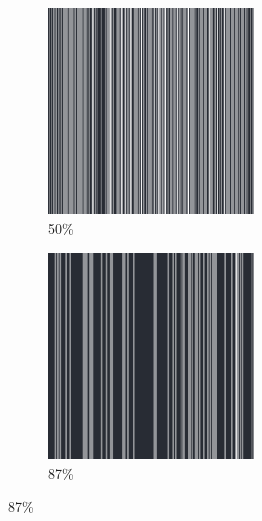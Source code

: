 \documentclass[12pt, fleqn]{report}                             %
\theoremstyle{break}                                            %
\begin{document}
\begin{figure}[ht!]
\begin{subfigure}[b]{0.4\linewidth}
          \includegraphics[width=0.6\textwidth]{Images/76/c.png}
          \caption{50\%}
        \end{subfigure}
        \begin{subfigure}[b]{0.4\linewidth}
          \includegraphics[width=0.6\textwidth]{Images/76/d.png}
          \caption{87\%}
        \end{subfigure}
      \end{figure}
\end{document}
